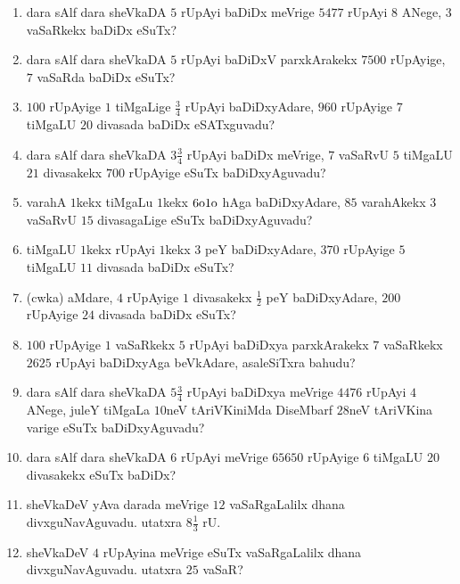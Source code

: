 \begin{enumerate}[\rm(1)]
\item dara sAlf dara sheVkaDA $5$ rUpAyi baDiDx meVrige $5477$ rUpAyi $8$ ANege, $3$ vaSaRkekx baDiDx eSuTx?

\item dara sAlf dara sheVkaDA $5$ rUpAyi baDiDxV parxkArakekx $7500$ rUpAyige, $7$ vaSaRda baDiDx eSuTx?

\item $100$ rUpAyige $1$ tiMgaLige $\tfrac{3}{4}$ rUpAyi baDiDxyAdare, $960$ rUpAyige $7$ tiMgaLU $20$ divasada baDiDx eSATxguvadu?

\item dara sAlf dara sheVkaDA $3\tfrac{3}{4}$ rUpAyi baDiDx meVrige, $7$ vaSaRvU $5$ tiMgaLU $21$ divasakekx $700$ rUpAyige eSuTx baDiDxyAguvadu?

\item varahA $1$kekx tiMgaLu $1$kekx ${\rm 6o1o}$ hAga baDiDxyAdare, $85$ varahAkekx $3$ vaSaRvU $15$ divasagaLige eSuTx baDiDxyAguvadu?

\item tiMgaLU $1$kekx rUpAyi $1$kekx $3$ peY baDiDxyAdare, $370$ rUpAyige $5$ tiMgaLU $11$ divasada baDiDx eSuTx?

\item (cwka) aMdare, $4$ rUpAyige $1$ divasakekx $\tfrac{1}{2}$ peY baDiDxyAdare, $200$ rUpAyige $24$ divasada baDiDx eSuTx?

\item $100$ rUpAyige $1$ vaSaRkekx $5$ rUpAyi baDiDxya parxkArakekx $7$ vaSaRkekx $2625$ rUpAyi baDiDxyAga beVkAdare, asaleSiTxra bahudu?

\item dara sAlf dara sheVkaDA $5\tfrac{3}{4}$ rUpAyi baDiDxya meVrige $4476$ rUpAyi  $4$ ANege, juleY tiMgaLa $10$neV tAriVKiniMda DiseMbarf $28$neV tAriVKina varige eSuTx baDiDxyAguvadu?

\item dara sAlf dara sheVkaDA $6$ rUpAyi meVrige $65650$ rUpAyige $6$ tiMgaLU $20$ divasakekx eSuTx baDiDx?

\item sheVkaDeV yAva darada meVrige $12$ vaSaRgaLalilx dhana divxguNavAguvadu.
\hfill utatxra $8\tfrac{1}{3}$\; rU.

\item sheVkaDeV $4$ rUpAyina meVrige eSuTx vaSaRgaLalilx dhana divxguNavAguvadu. \hfill utatxra\; $25$\; vaSaR?
\end{enumerate}

